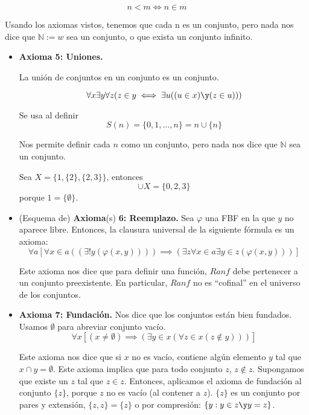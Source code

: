 	\begin{defn}[Menor]
		$$n<m\iff n\in m$$
	\end{defn}
	
	Usando los axiomas vistos, tenemos que cada n es un conjunto, pero nada nos dice que $\mathbb{N} :=w$ sea un conjunto, o que exista un conjunto infinito.
	
	\begin{itemize}
		\item \textbf{Axioma 5: Uniones.}
		  
		 La unión de conjuntos en un conjunto es un conjunto.
		 
		 $$\forall x \exists y \forall z (z\in y\iff\exists u((u\in x)\y (z\in u)))$$
		 
		 Se usa al definir $$S(n) = \{0, 1,\hdots,n\} = n\cup \{n\}$$
		 
		 Nos permite definir cada $n$ como un conjunto, pero nada nos dice que $\mathbb{N}$ sea un conjunto.		 
		 \begin{example}
			Sea $X=\{1,\{2\},\{2,3\}\}$, entonces
			$$\cup X = \{0, 2, 3\}$$ porque $1=\{\emptyset\}$.
		 \end{example}
		 
		 \item (Esquema de) \textbf{Axioma}(s) \textbf{6: Reemplazo.}
		 Sea $\varphi$ una FBF en la que $y$ no aparece libre. Entonces, la clausura universal de la siguiente fórmula es un axioma:
		 $$\forall a \left[\forall x\in a ((\exists! y (\varphi(x,y))))\implies (\exists z \forall x \in a \exists y \in z (\varphi(x,y)))\right]$$
		 
		 Este axioma nos dice que para definir una función, $Ran f$ debe pertenecer a un conjunto preexistente. En particular, $Ranf$ no es ``cofinal'' en el universo de los conjuntos.
		 
		 \item \textbf{Axioma 7: Fundación.}
		 Nos dice que los conjuntos están bien fundados. Usamos $\emptyset$ para abreviar conjunto vacío.
		 $$\forall x \left[(x\neq \emptyset)\implies (\exists y \in x (\forall z \in x (z\notin y)))\right]$$
		 
		 Este axioma nos dice que si $x$ no es vacío, contiene algún elemento $y$ tal que $x\cap y = \emptyset$. Este axioma implica que para todo conjunto $z$, $z\notin z$. Supongamos que existe un $z$ tal que $z\in z$. Entonces, aplicamos el axioma de fundación al conjunto $\{z\}$, porque $z$ no es vacío (al contener a $z$).  $\{z\}$ es un conjunto por pares y extensión, $\{z,z\} = \{z\}$ o por compresión: $\{y : y\in z \y  y=z\}$.
		 

\end{itemize}
